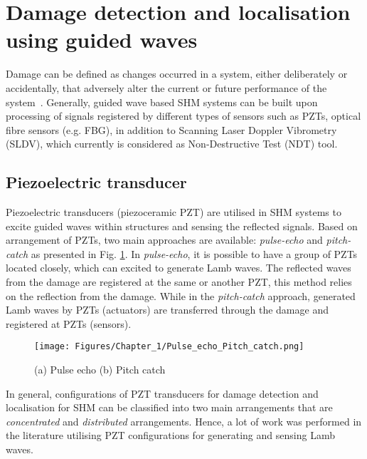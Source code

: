 \section[Damage identification]{Damage detection and localisation using guided waves}
\label{sec23}
Damage can be defined as changes occurred in a system, either deliberately or accidentally, that adversely alter the current or future performance of the system~\cite{Farrar2012}. 
Generally, guided wave based SHM systems can be built upon processing of signals registered by different types of sensors such as PZTs, optical fibre sensors (e.g. FBG), in addition to Scanning Laser Doppler Vibrometry (SLDV), which currently is considered as Non-Destructive Test (NDT) tool.
\subsection{Piezoelectric transducer} 
Piezoelectric transducers (piezoceramic PZT) are utilised in SHM systems to excite guided waves within structures and sensing the reflected signals. 
Based on arrangement of PZTs, two main approaches are available: \emph{pulse-echo} and \emph{pitch-catch} as presented in Fig. \ref{fig:Pulse_echo_Pitch_catch}.
In \emph{pulse-echo}, it is possible to have a group of PZTs located closely, which can excited to generate Lamb waves. 
The reflected waves from the damage are registered at the same or another PZT, this method relies on the reflection from the damage. 
While in the \emph{pitch-catch} approach, generated Lamb waves by PZTs (actuators) are transferred through the damage and registered at PZTs (sensors).
\begin{figure}[!ht]
	\begin{center}
		\centering
		\texttt{[image: Figures/Chapter\_1/Pulse\_echo\_Pitch\_catch.png]}
	\end{center}
	\caption{(a) Pulse echo	(b) Pitch catch} 
	\label{fig:Pulse_echo_Pitch_catch}
\end{figure}
In general, configurations of PZT transducers for damage detection and localisation for SHM can be classified into two main arrangements that are \emph{concentrated} and \emph{distributed} arrangements. 
Hence, a lot of work was performed in the literature utilising PZT configurations for generating and sensing  Lamb waves.


